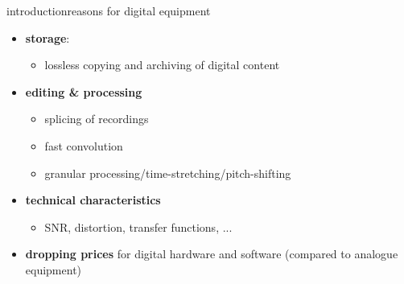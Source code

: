 \begin{frame}{introduction}{reasons for digital equipment}
	\begin{itemize}
        \item   \textbf{storage}:
            \begin{itemize}
                \item   lossless copying and archiving of digital content
            \end{itemize}
        \smallskip
        \item<2->   \textbf{editing \& processing} 
            \begin{itemize}
                \item   splicing of recordings
                \item   fast convolution
                \item   granular processing/time-stretching/pitch-shifting
            \end{itemize}
        \smallskip
		\item<3->	\textbf{technical characteristics}
			\begin{itemize}
				\item	SNR, distortion, transfer functions, ...
			\end{itemize}
        \bigskip
        \item<4->   \textbf{dropping prices} for digital hardware and software (compared to analogue equipment)
    \end{itemize}
\end{frame}

